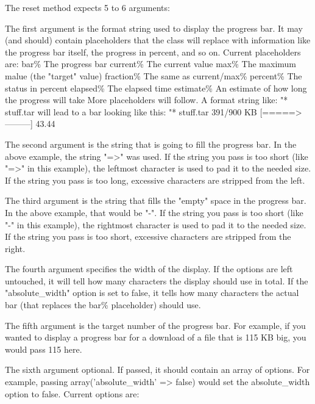 \begin{DoxyPre}
 The reset method expects 5 to 6 arguments:
\begin{DoxyItemize}
\item The first argument is the format string used to display the progress
   bar. It may (and should) contain placeholders that the class will
   replace with information like the progress bar itself, the progress in
   percent, and so on. Current placeholders are:
     bar\%         The progress bar
     current\%     The current value
     max\%         The maximum malue (the "target" value)
     fraction\%    The same as current/max\%
     percent\%     The status in percent
     elapsed\%     The elapsed time
     estimate\%    An estimate of how long the progress will take
   More placeholders will follow. A format string like:
   "* stuff.tar %
   will lead to a bar looking like this:
   "* stuff.tar 391/900 KB [=====>---------]  43.44%
\item The second argument is the string that is going to fill the progress
   bar. In the above example, the string "=>" was used. If the string you
   pass is too short (like "=>" in this example), the leftmost character
   is used to pad it to the needed size. If the string you pass is too long,
   excessive characters are stripped from the left.
\item The third argument is the string that fills the "empty" space in the
   progress bar. In the above example, that would be "-". If the string
   you pass is too short (like "-" in this example), the rightmost
   character is used to pad it to the needed size. If the string you pass
   is too short, excessive characters are stripped from the right.
\item The fourth argument specifies the width of the display. If the options
   are left untouched, it will tell how many characters the display should
   use in total. If the "absolute\_width" option is set to false, it tells
   how many characters the actual bar (that replaces the bar\%
   placeholder) should use.
\item The fifth argument is the target number of the progress bar. For
   example, if you wanted to display a progress bar for a download of a
   file that is 115 KB big, you would pass 115 here.
\item The sixth argument optional. If passed, it should contain an array of
   options. For example, passing array('absolute\_width' => false) would
   set the absolute\_width option to false. Current options are:
\end{DoxyItemize}\end{DoxyPre}



